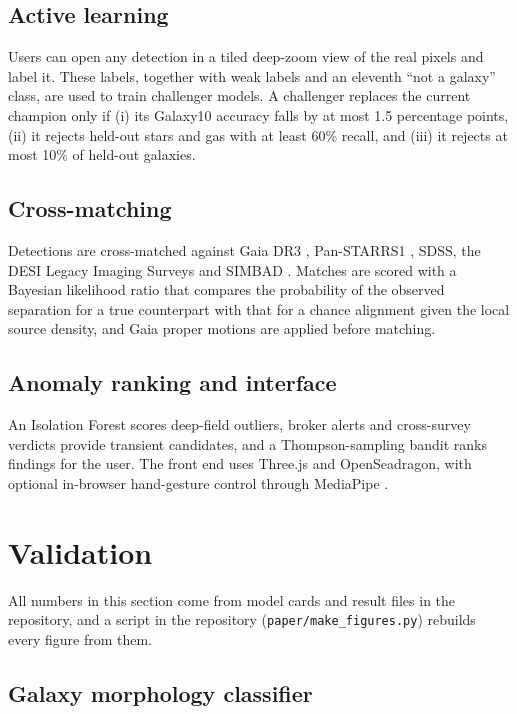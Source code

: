 \documentclass[preprint,11pt,authoryear]{elsarticle}
\begin{document}
\subsection{Active learning}

Users can open any detection in a tiled deep-zoom view of the real pixels and
label it. These labels, together with weak labels and an eleventh
``not a galaxy'' class, are used to train challenger models. A challenger
replaces the current champion only if (i) its Galaxy10 accuracy falls by at most
1.5 percentage points, (ii) it rejects held-out stars and gas with at least 60\%
recall, and (iii) it rejects at most 10\% of held-out galaxies.

\subsection{Cross-matching}

Detections are cross-matched against Gaia DR3 \citep{Gaia2023}, Pan-STARRS1
\citep{Chambers2016}, SDSS, the DESI Legacy Imaging Surveys \citep{Dey2019} and
SIMBAD \citep{Wenger2000}. Matches are scored with a Bayesian likelihood ratio
that compares the probability of the observed separation for a true counterpart
with that for a chance alignment given the local source density, and Gaia proper
motions are applied before matching.

\subsection{Anomaly ranking and interface}

An Isolation Forest \citep{Liu2008} scores deep-field outliers, broker alerts
and cross-survey verdicts provide transient candidates, and a Thompson-sampling
bandit \citep{Thompson1933} ranks findings for the user. The front end uses
Three.js and OpenSeadragon, with optional in-browser hand-gesture control through
MediaPipe \citep{Lugaresi2019}.

\section{Validation}
\label{sec:validation}

All numbers in this section come from model cards and result files in the
repository, and a script in the repository (\texttt{paper/make\_figures.py})
rebuilds every figure from them.

\subsection{Galaxy morphology classifier}
\end{document}
